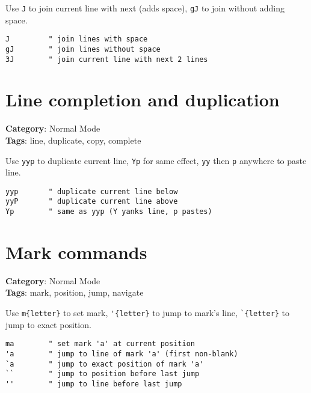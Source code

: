 {{{{{{{{{Use {\footnotesize \Verb§J§} to join current line with next (adds space), {\footnotesize \Verb§gJ§} to join without adding space.

\begin{Exa*}{}
\begin{Verbatim}[fontsize=\footnotesize, breaklines, breakanywhere]
J         " join lines with space
gJ        " join lines without space
3J        " join current line with next 2 lines
\end{Verbatim}
\end{Exa*}

\section{Line completion and duplication}

\textbf{Category}: Normal Mode\\ \textbf{Tags}: line, duplicate, copy, complete
\vspace{0.5cm}

Use {\footnotesize \Verb§yyp§} to duplicate current line, {\footnotesize \Verb§Yp§} for same effect, {\footnotesize \Verb§yy§} then {\footnotesize \Verb§p§} anywhere to paste line.

\begin{Exa*}{}
\begin{Verbatim}[fontsize=\footnotesize, breaklines, breakanywhere]
yyp       " duplicate current line below
yyP       " duplicate current line above
Yp        " same as yyp (Y yanks line, p pastes)
\end{Verbatim}
\end{Exa*}

\section{Mark commands}

\textbf{Category}: Normal Mode\\ \textbf{Tags}: mark, position, jump, navigate
\vspace{0.5cm}

Use {\footnotesize \Verb§m{letter}§} to set mark, {\footnotesize \Verb§'{letter}§} to jump to mark's line, {\footnotesize \Verb§`{letter}§} to jump to exact position.

\begin{Exa*}{}
\begin{Verbatim}[fontsize=\footnotesize, breaklines, breakanywhere]
ma        " set mark 'a' at current position
'a        " jump to line of mark 'a' (first non-blank)
`a        " jump to exact position of mark 'a'
``        " jump to position before last jump
''        " jump to line before last jump
\end{Verbatim}
\end{Exa*}

}}}}}}}}}
